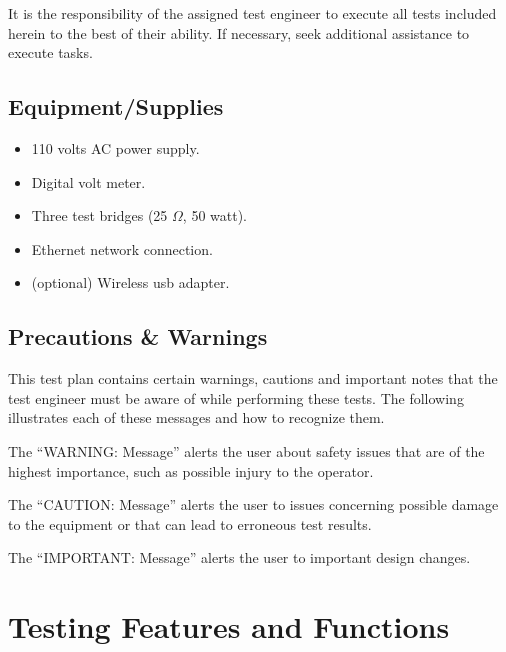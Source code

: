 \documentclass{article}
\begin{document}
It is the responsibility of the assigned test engineer to execute all tests
included herein to the best of their ability. If necessary, seek additional
assistance to execute tasks.


\subsection{Equipment/Supplies}

\begin{itemize}
\item 110 volts AC power supply.
\item Digital volt meter.
\item Three test bridges (25 $\Omega$, 50 watt).
\item Ethernet network connection.
\item (optional) Wireless usb adapter.
\end{itemize}

\subsection{Precautions \& Warnings}

This test plan contains certain warnings, cautions and important
notes that the test engineer must be aware of while performing these tests.
The following illustrates each of these messages and how to recognize them.


The ``WARNING: Message'' alerts the user about safety issues that are of
the highest importance, such as possible injury to the operator.


The ``CAUTION: Message'' alerts the user to issues concerning possible
damage to the equipment or that can lead to erroneous test results.


The ``IMPORTANT: Message'' alerts the user to important design changes.


\section{Testing Features and Functions}
\end{document}
